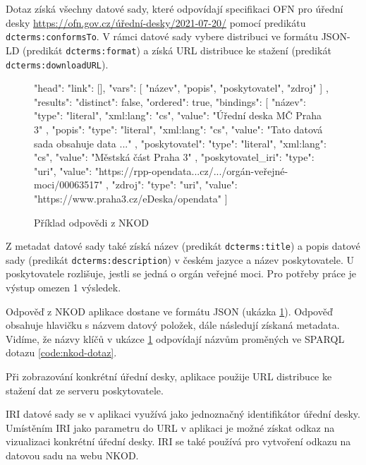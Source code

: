 Dotaz získá všechny datové sady, které odpovídají specifikaci OFN pro úřední desky \url{https://ofn.gov.cz/úřední-desky/2021-07-20/} pomocí predikátu \\
\texttt{dcterms:conformsTo}. 
V rámci datové sady vybere distribuci ve formátu JSON-LD (predikát \texttt{dcterms:format}) a získá URL distribuce ke stažení (predikát \\ \texttt{dcterms:downloadURL}). 


\begin{figure}[h!]
    \label{code:nkod-res}
\begin{code}
{
  "head": {
    "link": [],
    "vars": [
      "název",
      "popis",
      "poskytovatel",
      "zdroj"
    ]
  },
  "results": {
    "distinct": false,
    "ordered": true,
    "bindings": [
      {
        "název": {
          "type": "literal",
          "xml:lang": "cs",
          "value": "Úřední deska MČ Praha 3"
        },
        "popis": {
          "type": "literal",
          "xml:lang": "cs",
          "value": "Tato datová sada obsahuje data ..."
        },
        "poskytovatel": {
          "type": "literal",
          "xml:lang": "cs",
          "value": "Městská část Praha 3"
        },
        "poskytovatel_iri": {
          "type": "uri",
          "value": 
            "https://rpp-opendata...cz/.../orgán-veřejné-moci/00063517"
        },
        "zdroj": {
          "type": "uri",
          "value": "https://www.praha3.cz/eDeska/opendata"
        }
      }
    ]
  }
}
\end{code}
\caption{Příklad odpovědi z NKOD}
\end{figure}

Z metadat datové sady také získá název (predikát \texttt{dcterms:title}) a popis datové sady (predikát \texttt{dcterms:description}) v českém jazyce a název poskytovatele. U poskytovatele rozlišuje, jestli se jedná o orgán veřejné moci. Pro potřeby práce je výstup omezen 1 výsledek.

Odpověď z NKOD aplikace dostane ve formátu JSON (ukázka \ref{code:nkod-res}). Odpověď obsahuje hlavičku s názvem datový položek, dále následují získaná metadata. Vidíme, že názvy klíčů v ukázce \ref{code:nkod-res} odpovídají názvům proměných ve SPARQL dotazu \ref{code:nkod-dotaz}.

Při zobrazování konkrétní úřední desky, aplikace použije URL distribuce ke stažení dat ze serveru poskytovatele.

IRI datové sady se v aplikaci využívá jako jednoznačný identifikátor úřední desky. Umístěním IRI jako parametru do URL v aplikaci je možné získat odkaz na vizualizaci konkrétní úřední desky. IRI se také používá pro vytvoření odkazu na datovou sadu na webu NKOD.

